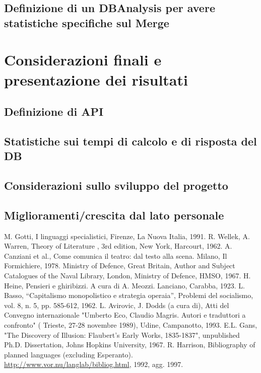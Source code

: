 \documentclass[12pt]{report}
\begin{document}
\section{Definizione di un DBAnalysis per avere statistiche specifiche sul Merge}


\chapter{Considerazioni finali e presentazione dei risultati}
\label{cap3}

\section{Definizione di API}

\section{Statistiche sui tempi di calcolo e di risposta del DB}

\section{Considerazioni sullo sviluppo del progetto}

\section{Miglioramenti/crescita dal lato personale}


%
%

%
%
\begin{thebibliography}{00}
%
M. Gotti, I linguaggi specialistici, Firenze, La Nuova Italia, 1991.
%
R. Wellek, A. Warren, Theory of Literature , 3rd edition, New York, Harcourt, 1962.
%
A. Canziani et al., Come comunica il teatro: dal testo alla scena. Milano, Il Formichiere, 1978.
%
Ministry of Defence, Great Britain, Author and Subject Catalogues of the Naval Library, London, Ministry of Defence, HMSO, 1967.
%
H. Heine, Pensieri e ghiribizzi. A cura di A. Meozzi. Lanciano, Carabba, 1923.
%
L. Basso, ``Capitalismo monopolistico e strategia operaia'', Problemi del socialismo, vol. 8, n. 5, pp. 585-612, 1962.
%
L. Avirovic, J. Dodds (a cura di), Atti del Convegno internazionale "Umberto Eco, Claudio Magris. Autori e traduttori a confronto" ( Trieste, 27-28 novembre 1989), Udine, Campanotto, 1993.
%
E.L. Gans, "The Discovery of Illusion: Flaubert's Early Works, 1835-1837", unpublished Ph.D. Dissertation, Johns Hopkins University, 1967.
%
R. Harrison, Bibliography of planned languages (excluding Esperanto).  \url{http://www.vor.nu/langlab/bibliog.html}, 1992, agg. 1997.
%
\end{thebibliography}
% 
\end{document}
